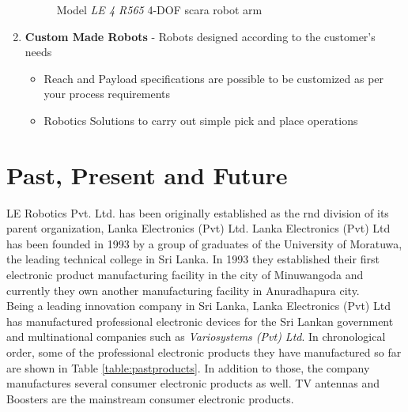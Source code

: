 \documentclass[a4paper,12pt]{report}%
\begin{document}
\begin{enumerate}
	\begin{figure}[H]
		\centering
		\caption{Model \textit{LE 4 R565} 4-DOF \ac{scara} robot arm\cite{scara_robots}}
		\label{fig:fourdofrobot}
	\end{figure}
	
	
	
	\item \textbf{Custom Made Robots} - Robots designed according to the customer's needs
	\begin{itemize}
		\item Reach and Payload specifications are possible to be customized as per your process requirements
		\item Robotics Solutions to carry out simple pick and place operations
	\end{itemize}
\end{enumerate}

\section{Past, Present and	Future}

LE Robotics Pvt. Ltd. has been originally established as the \ac{rnd} division of its parent organization, Lanka Electronics (Pvt) Ltd. Lanka Electronics (Pvt) Ltd has been founded in 1993  by a group of graduates of the University of Moratuwa, the leading technical college in Sri Lanka. In 1993 they established their first electronic product manufacturing facility in the city of Minuwangoda and currently they own another manufacturing facility in Anuradhapura city.\\

Being a leading innovation company in Sri Lanka, Lanka Electronics (Pvt) Ltd
has manufactured professional electronic devices for the Sri Lankan government and multinational companies such as \textit{Variosystems (Pvt) Ltd}. In chronological order, some of the professional electronic products they have manufactured so far are shown in Table \ref{table:pastproducts}. In addition to those, the company manufactures several consumer electronic products as well. TV antennas and Boosters are the mainstream consumer electronic products.
\end{document}
